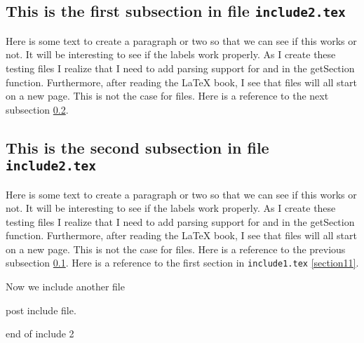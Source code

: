 \subsection{This is the first subsection in file \texttt{include2.tex}}
\label{section21}

Here is some text to create a paragraph or two so that we
can see if this works or not.  It will be interesting to see
if the labels work properly.  As I create these testing files
I realize that I need to add parsing support for \verb##
and \verb## in the getSection function.   Furthermore,
after reading the \LaTeX{} book, I see that \verb## 
files will all start on a new page.  This is not the case for
\verb## files.  Here is a reference to the next subsection \ref{section22}.

\subsection{This is the second subsection in file \texttt{include2.tex}}
\label{section22}

Here is some text to create a paragraph or two so that we
can see if this works or not.  It will be interesting to see
if the labels work properly.  As I create these testing files
I realize that I need to add parsing support for \verb##
and \verb## in the getSection function.   Furthermore,
after reading the \LaTeX{} book, I see that \verb## 
files will all start on a new page.  This is not the case for
\verb## files.  Here is a reference to the previous subsection \ref{section21}.
Here is a reference to the first section in \texttt{include1.tex}
\ref{section11}.

Now we include another file

post include file.

end of include 2
